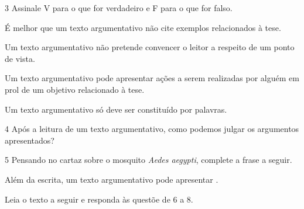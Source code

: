 \num{3} Assinale V para o que for verdadeiro e F para o que for falso.

\begin{boxlist}
\item É melhor que um texto argumentativo não cite exemplos relacionados à tese. 

\item Um texto argumentativo não pretende convencer o leitor a respeito de
um ponto de vista. 

\item Um texto argumentativo pode apresentar ações a serem realizadas por alguém em prol de um objetivo relacionado à tese. 

\item Um texto argumentativo só deve ser constituído por palavras. 
\end{boxlist}

\num{4} Após a leitura de um texto argumentativo, como podemos julgar os argumentos apresentados?



\num{5} Pensando no cartaz sobre o mosquito \textit{Aedes aegypti}, complete a frase a seguir.

Além da escrita, um texto argumentativo pode apresentar \preencher. 

Leia o texto a seguir e responda às questõe de 6 a 8.

